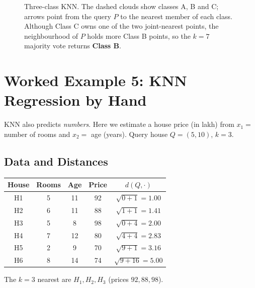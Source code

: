 \documentclass[11pt,a4paper]{report}
\theoremstyle{definition}
\theoremstyle{remark}
\begin{document}
\begin{figure}[ht]
		\caption{Three-class KNN. The dashed clouds show classes A, B and C; arrows
			point from the query $P$ to the nearest member of each class. Although Class C
			owns one of the two joint-nearest points, the neighbourhood of $P$ holds more
			Class B points, so the $k=7$ majority vote returns \textbf{Class B}.}
		\label{fig:multiclass}
	\end{figure}
	
	\chapter{Worked Example 5: KNN Regression by Hand}
	\label{ch:regress}
	
	KNN also predicts \emph{numbers}. Here we estimate a house price (in lakh)
	from $x_1=$ number of rooms and $x_2=$ age (years). Query house $Q=(5,10)$,
	$k=3$.
	
	\section{Data and Distances}
	\begin{center}
		\renewcommand{\arraystretch}{1.2}
		\begin{tabular}{c c c c c}
			\toprule
			House & Rooms & Age & Price & $d(Q,\cdot)$\\
			\midrule
			H1 & 5 & 11 & 92 & $\sqrt{0+1}=\mathbf{1.00}$\\
			H2 & 6 & 11 & 88 & $\sqrt{1+1}=\mathbf{1.41}$\\
			H3 & 5 & 8  & 98 & $\sqrt{0+4}=\mathbf{2.00}$\\
			H4 & 7 & 12 & 80 & $\sqrt{4+4}=2.83$\\
			H5 & 2 & 9  & 70 & $\sqrt{9+1}=3.16$\\
			H6 & 8 & 14 & 74 & $\sqrt{9+16}=5.00$\\
			\bottomrule
		\end{tabular}
	\end{center}
	The $k=3$ nearest are $H_1,H_2,H_3$ (prices $92,88,98$).
	
\end{document}
